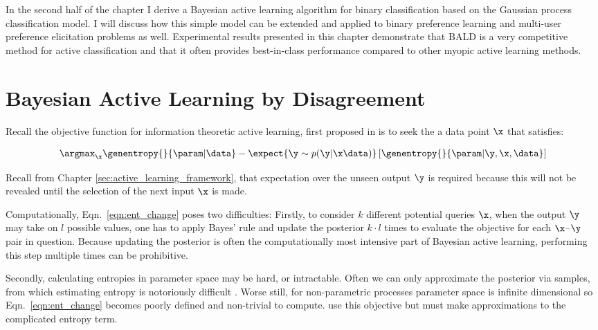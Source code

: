 In the second half of the chapter I derive a Bayesian active learning algorithm for binary classification based on the Gaussian process classification model. I will discuss how this simple model can be extended and applied to binary preference learning and multi-user preference elicitation problems as well. Experimental results presented in this chapter demonstrate that BALD is a very competitive method for active classification and that it often provides best-in-class performance compared to other myopic active learning methods.

\section{Bayesian Active Learning by Disagreement}

Recall the objective function for information theoretic active learning, first proposed in \citep{lindley1956} is to seek the a data point $\x$ that satisfies:

\begin{align}	
	\label{eqn:ent_change}
	\argmax_{\x} \genentropy{}{\param | \data} - \expect{\y\sim p(\y|\x\data)} \left[ \genentropy{}{\param| \y, \x,\data} \right] 
\end{align}

Recall from Chapter \ref{sec:active_learning_framework}, that expectation over the unseen output $\y$ is required because this will not be revealed until the selection of the next input $\x$ is made.

Computationally, Eqn.\ \eqref{eqn:ent_change} poses two difficulties: Firstly, to consider $k$ different potential queries $\x$, when the output $\y$ may take on $l$ possible values, one has to apply Bayes' rule and update the posterior $k\cdot l$ times to evaluate the objective for each $\x$--$\y$ pair in question. Because updating the posterior is often the computationally most intensive part of Bayesian active learning, performing this step multiple times can be prohibitive.

Secondly, calculating entropies in parameter space may be hard, or intractable. Often we can only approximate the posterior via samples, from which estimating entropy is notoriously difficult \citep{panzeri2007}. Worse still, for non-parametric processes parameter space is infinite dimensional so Eqn.\ \eqref{eqn:ent_change} becomes poorly defined and non-trivial to compute. \citep{MacKay1992, Krishnapuram2004, Lawrence2004} use this objective but must make approximations to the complicated entropy term.

